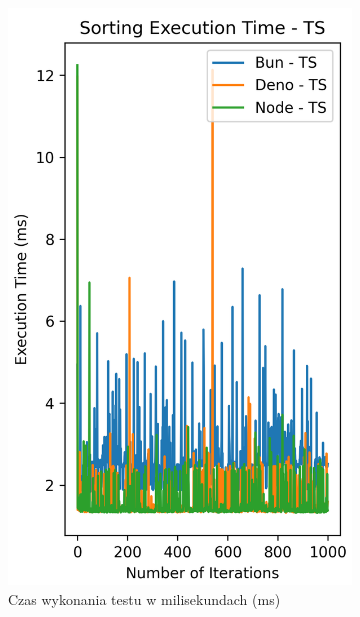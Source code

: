 \begin{figure}[H]
  \centering
  \begin{subfigure}[b]{0.4\textwidth}
    \centering
    \includegraphics[width=\textwidth]{Figures/sorting/sorting_radix_1000_10000_ts_time.png}
    \caption{Czas wykonania testu w milisekundach (ms)}
    \label{fig:radix_sorting_e4_ts_time}
  \end{subfigure}
  \begin{subfigure}[b]{0.4\textwidth}
    \centering

\end{subfigure}
\end{figure}
